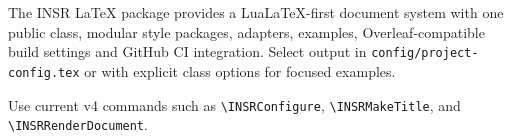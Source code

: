 \documentclass[config/load-project=false, metadata/institution={INSR Example Institution}, document/type=manual,metadata/title={INSR LaTeX Package Manual},metadata/author={INSR Research Consortium}]{insr}
\begin{document}
\INSRMakeTitle
\tableofcontents
{}
The INSR LaTeX package provides a LuaLaTeX-first document system with one public class, modular style packages, adapters, examples, Overleaf-compatible build settings and GitHub CI integration.
Select output in \texttt{config/project-config.tex} or with explicit class options for focused examples.
\begin{ClinicalNote}
Use current v4 commands such as \texttt{\textbackslash INSRConfigure}, \texttt{\textbackslash INSRMakeTitle}, and \texttt{\textbackslash INSRRenderDocument}.
\end{ClinicalNote}
\end{document}
